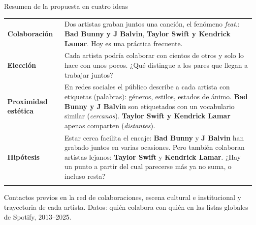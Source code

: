 \documentclass[
  8pt,
  ignorenonframetext,
  aspectratio=169,
  spanish,
]{beamer}
\newcommand{\lightrowrule}{\arrayrulecolor{black!25}\specialrule{0.4pt}{1pt}{1pt}\arrayrulecolor{black}}
\begin{document}
\begin{frame}{Resumen de la propuesta en cuatro ideas}
\label{resumen-de-la-propuesta-en-cuatro-ideas}
~

\begin{longtable}[]{@{}
  >{\raggedright\arraybackslash}p{}
  >{\raggedright\arraybackslash}p{}@{}}
\toprule\noalign{}
\endhead
\bottomrule\noalign{}
\endlastfoot
\textbf{Colaboración} & Dos artistas graban juntos una canción, el
fenómeno \emph{feat.}: \textbf{Bad Bunny y J Balvin}, \textbf{Taylor
Swift y Kendrick Lamar}. Hoy es una práctica frecuente. \\ \lightrowrule
\textbf{Elección} & Cada artista podría colaborar con cientos de otros y
solo lo hace con unos pocos. ¿Qué distingue a los pares que llegan a
trabajar juntos? \\ \lightrowrule
\textbf{Proximidad estética} & En redes sociales el público describe a
cada artista con etiquetas (palabras): géneros, estilos, estados de
ánimo. \textbf{Bad Bunny y J Balvin} son etiquetados con un vocabulario
similar (\emph{cercanos}). \textbf{Taylor Swift y Kendrick Lamar} apenas
comparten (\emph{distantes}). \\ \lightrowrule
\textbf{Hipótesis} & Estar cerca facilita el encaje: \textbf{Bad Bunny}
y \textbf{J Balvin} han grabado juntos en varias ocasiones. Pero también
colaboran artistas lejanos: \textbf{Taylor Swift} y \textbf{Kendrick
Lamar}. ¿Hay un punto a partir del cual parecerse más ya no suma, o
incluso resta? \\ \lightrowrule
\end{longtable}

\begin{tcolorbox}[enhanced jigsaw, arc=.35mm, bottomtitle=1mm, colbacktitle=quarto-callout-note-color!10!white, breakable, toprule=.15mm, coltitle=black, colback=white, rightrule=.15mm, colframe=quarto-callout-note-color-frame, leftrule=.75mm, toptitle=1mm, opacitybacktitle=0.6, opacityback=0, title={Variables adicionales}, titlerule=0mm, bottomrule=.15mm, left=2mm]

Contactos previos en la red de colaboraciones, escena cultural e
institucional y trayectoria de cada artista. Datos: quién colabora con
quién en las listas globales de Spotify, 2013--2025.

\end{tcolorbox}

\end{frame}
\end{document}
